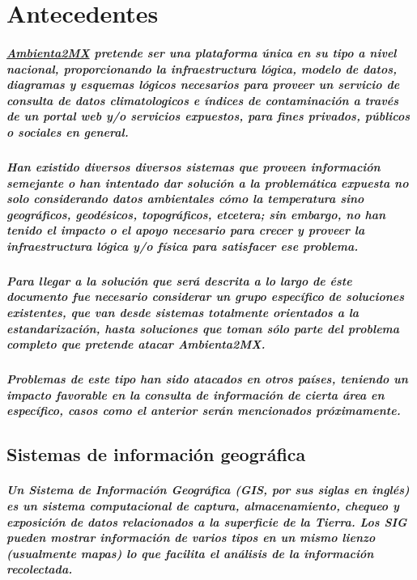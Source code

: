 \chapter {Antecedentes}
    \paragraph{\underline{Ambienta2MX} pretende ser una plataforma única en su tipo a nivel nacional, proporcionando la infraestructura lógica, modelo de datos, diagramas y esquemas lógicos necesarios para proveer un servicio de consulta de datos climatologicos e índices de contaminación a través de un portal web y/o servicios expuestos, para fines privados, públicos o sociales en general.}
    \paragraph{Han existido diversos diversos sistemas que proveen información semejante o han intentado dar solución a la problemática expuesta no solo considerando datos ambientales cómo la temperatura sino geográficos, geodésicos, topográficos, etcetera; sin embargo, no han tenido el impacto o el apoyo necesario para crecer y proveer la infraestructura lógica y/o física para satisfacer ese problema.}
    \paragraph{Para llegar a la solución que será descrita a lo largo de éste documento fue necesario considerar un grupo específico de soluciones existentes, que van desde sistemas totalmente orientados a la estandarización, hasta soluciones que toman sólo parte del problema completo que pretende atacar Ambienta2MX.}
    \paragraph{Problemas de este tipo han sido atacados en otros países, teniendo un impacto favorable en la consulta de información de cierta área en específico, casos como el anterior serán mencionados próximamente.}
\newpage
  \section {Sistemas de información geográfica}
    \paragraph {Un Sistema de Información Geográfica (GIS, por sus siglas en inglés) es un sistema computacional de captura, almacenamiento, chequeo y exposición de datos relacionados a la superficie de la Tierra. Los SIG pueden mostrar información de varios tipos en un mismo lienzo (usualmente mapas) lo que facilita el análisis de la información recolectada.\cite{5}}

